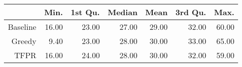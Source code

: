 \begin{table}[ht]
\centering
\begin{tabular}{rrrrrrr}
  \hline
 & Min. & 1st Qu. & Median & Mean & 3rd Qu. & Max. \\ 
  \hline
Baseline & 16.00 & 23.00 & 27.00 & 29.00 & 32.00 & 60.00 \\ 
  Greedy & 9.40 & 23.00 & 28.00 & 30.00 & 33.00 & 65.00 \\ 
  TFPR & 16.00 & 24.00 & 28.00 & 30.00 & 32.00 & 59.00 \\ 
   \hline
\end{tabular}
\end{table}
